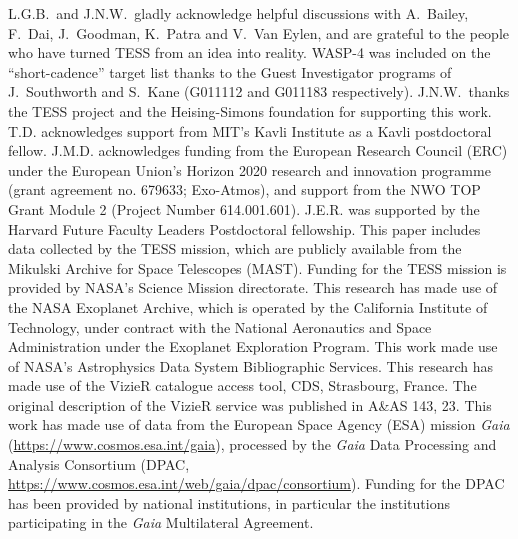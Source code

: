 \documentclass[12pt,twocolumn,tighten]{aastex62}
\begin{document}
{\acknowledgements
L.G.B.\ and J.N.W.\ gladly acknowledge helpful discussions with
A.~Bailey, F.~Dai, J.~Goodman, K.~Patra and V.~Van Eylen, and are
grateful to the people who have turned TESS from an idea into reality.
%
WASP-4 was included on the ``short-cadence'' target list thanks to the
Guest Investigator programs of J.\ Southworth and S.\ Kane (G011112
and G011183 respectively). 
%
J.N.W.\ thanks the TESS project and the Heising-Simons foundation for
supporting this work.
%
T.D. acknowledges support from MIT's Kavli Institute as a Kavli
postdoctoral fellow.
%
J.M.D. acknowledges funding from the European Research Council (ERC)
under the European Union's Horizon 2020 research and innovation
programme (grant agreement no. 679633; Exo-Atmos), and support from
the NWO TOP Grant Module 2 (Project Number 614.001.601).
%
J.E.R. was supported by the Harvard Future Faculty Leaders
Postdoctoral fellowship.
%
This paper includes data collected by the TESS mission, which are
publicly available from the Mikulski Archive for Space Telescopes
(MAST).
%
Funding for the TESS mission is provided by NASA's Science Mission
directorate.
%
This research has made use of the NASA Exoplanet Archive, which is
operated by the California Institute of Technology, under contract
with the National Aeronautics and Space Administration under the
Exoplanet Exploration Program.
%
This work made use of NASA's Astrophysics Data System Bibliographic
Services.
%
This research has made use of the VizieR catalogue access tool, CDS,
Strasbourg, France. The original description of the VizieR service was
published in A\&AS 143, 23.
%
This work has made use of data from the European Space Agency (ESA)
mission {\it Gaia} (\url{https://www.cosmos.esa.int/gaia}), processed
by the {\it Gaia} Data Processing and Analysis Consortium (DPAC,
\url{https://www.cosmos.esa.int/web/gaia/dpac/consortium}). Funding
for the DPAC has been provided by national institutions, in particular
the institutions participating in the {\it Gaia} Multilateral
Agreement.
%
\newline
%
%

}
\end{document}
